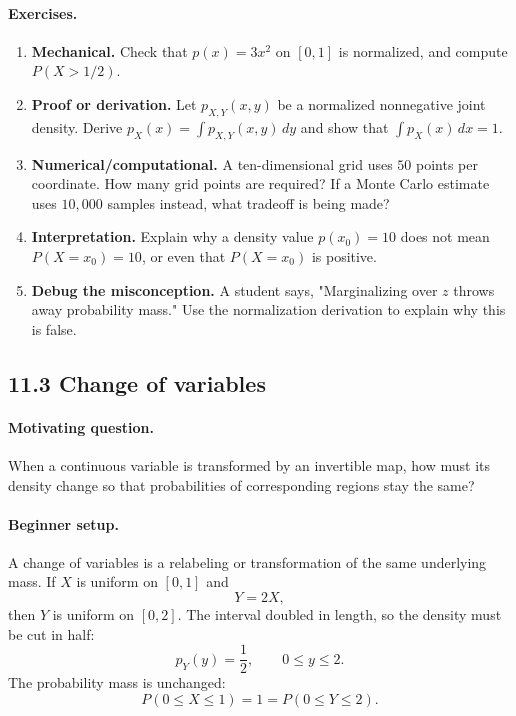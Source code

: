 \paragraph{Exercises.}
\begin{enumerate}[label=\textbf{11.2.\arabic*.}, leftmargin=*]
\item \textbf{Mechanical.} Check that \(p(x)=3x^2\) on \([0,1]\) is normalized, and compute \(P(X>1/2)\).
\item \textbf{Proof or derivation.} Let \(p_{X,Y}(x,y)\) be a normalized nonnegative joint density. Derive \(p_X(x)=\int p_{X,Y}(x,y)\,dy\) and show that \(\int p_X(x)\,dx=1\).
\item \textbf{Numerical/computational.} A ten-dimensional grid uses \(50\) points per coordinate. How many grid points are required? If a Monte Carlo estimate uses \(10{,}000\) samples instead, what tradeoff is being made?
\item \textbf{Interpretation.} Explain why a density value \(p(x_0)=10\) does not mean \(P(X=x_0)=10\), or even that \(P(X=x_0)\) is positive.
\item \textbf{Debug the misconception.} A student says, "Marginalizing over \(z\) throws away probability mass." Use the normalization derivation to explain why this is false.
\end{enumerate}

\subsection{11.3 Change of variables}

\paragraph{Motivating question.}
When a continuous variable is transformed by an invertible map, how must its density change so that probabilities of corresponding regions stay the same?

\paragraph{Beginner setup.}
A change of variables is a relabeling or transformation of the same underlying mass. If \(X\) is uniform on \([0,1]\) and
\[
Y=2X,
\]
then \(Y\) is uniform on \([0,2]\). The interval doubled in length, so the density must be cut in half:
\[
p_Y(y)=\frac{1}{2},\qquad 0\leq y\leq2.
\]
The probability mass is unchanged:
\[
P(0\leq X\leq 1)=1=P(0\leq Y\leq2).
\]

